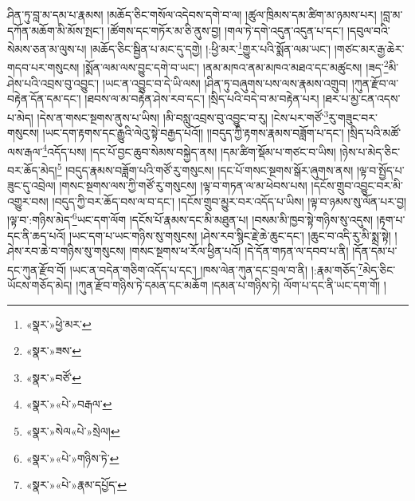 ཤིན་ཏུ་བླ་མ་དམ་པ་རྣམས། །མཆོད་ཅིང་གསོལ་འདེབས་དགེ་བ་ལ། །ཚུལ་ཁྲིམས་དམ་ཚིག་མ་ཉམས་པར། །བླ་མ་དཀོན་མཆོག་མི་མོས་སྤང་། །ཚོགས་དང་གཏོར་མ་ཅི་ནུས་བྱ། །གལ་ཏེ་དགེ་འདུན་འདུན་པ་དང་། །དབུལ་བའི་སེམས་ཅན་མ་ལུས་པ། །མཆོད་ཅིང་སྦྱིན་པ་མང་དུ་དགྱེ། །:ཕྱི་མར་\footnote{«སྣར་»ཕྱེ་མར་}གྱུར་པའི་སྨོན་ལམ་ཡང་། །གཙང་མར་རྒྱ་ཆེར་གདབ་པར་གསུངས། །སྨོན་ལམ་ལས་བྱུང་དགེ་བ་ཡང་། །ནམ་མཁའ་ནམ་མཁའ་མཐའ་དང་མཚུངས། །ཟད་\footnote{«སྣར་»ཟས་}མི་ཤེས་པའི་འབྲས་བུ་འབྱུང་། །ཡང་ན་འབྱུང་བ་དེ་ཡི་ལས། །ཤིན་ཏུ་བཞུགས་པས་ལས་རྣམས་འགྲུབ། །ཀུན་རྫོབ་ལ་བརྟེན་དོན་དམ་དང་། །ཐབས་ལ་མ་བརྟེན་ཤེས་རབ་དང་། །སྲིད་པའི་བདེ་བ་མ་བརྟེན་པར། །ཐར་པ་མྱ་ངན་འདས་པ་མེད། །དེས་ན་གསང་སྔགས་ནུས་པ་ཡིས། །མི་བསླུ་འབྲས་བུ་འབྱུང་བ་རུ། །ངེས་པར་གཙོ་\footnote{«སྣར་»བཙོ་}རུ་གཟུང་བར་གསུངས། །ཡང་དག་རྟགས་དང་རྒྱུའི་ལེའུ་སྟེ་བརྒྱད་པའོ།། །།བདུད་ཀྱི་རྟགས་རྣམས་བཟློག་པ་དང་། །སྲིད་པའི་མཚོ་ལས་རྒལ་\footnote{«སྣར་»«པེ་»བརྒལ་}འདོད་པས། །དང་པོ་བྱང་ཆུབ་སེམས་བསྐྱེད་ནས། །དམ་ཚིག་སྡོམ་པ་གཙང་བ་ཡིས། །ཉེས་པ་མེད་ཅིང་བར་ཆོད་མེད།\footnote{«སྣར་»སེལ«པེ་»སྲེལ།} །བདུད་རྣམས་བཟློག་པའི་གཙོ་རུ་གསུངས། །དང་པོ་གསང་སྔགས་སྒོར་ཞུགས་ནས། །ལྟ་བ་སྤྱོད་པ་ཟུང་དུ་འབྲེལ། །གསང་སྔགས་ལས་ཀྱི་གཙོ་རུ་གསུངས། །ལྟ་བ་གཏན་ལ་མ་ཕེབས་པས། །དངོས་གྲུབ་འབྱུང་བར་མི་འགྱུར་བས། །བདུད་ཀྱི་བར་ཆོད་བས་ལ་བ་དང་། །དངོས་གྲུབ་མྱུར་བར་འདོད་པ་ཡིས། །ལྟ་བ་ཉམས་སུ་ལོན་པར་བྱ། །ལྟ་བ་:གཉིས་མེད་\footnote{«སྣར་»«པེ་»གཉིས་ཏེ་}ཡང་དག་ལོག །དངོས་པོ་རྣམས་དང་མི་མཐུན་པ། །བསམ་མི་ཁྱབ་སྟེ་གཉིས་སུ་འདུས། །རྟག་པ་དང་ནི་ཆད་པའོ། །ཡང་དག་པ་ཡང་གཉིས་སུ་གསུངས། །ཤེས་རབ་སྙིང་རྗེ་ཆེ་ཆུང་དང་། །ཆུང་བ་འདི་རུ་མི་སྨྲ་སྟེ། །ཤེས་རབ་ཆེ་བ་གཉིས་སུ་གསུངས། །གསང་སྔགས་ཕ་རོལ་ཕྱིན་པའོ། །དེ་དོན་གཏན་ལ་དབབ་པ་ནི། །དོན་དམ་པ་དང་ཀུན་རྫོབ་བོ། །ཡང་ན་བདེན་གཅིག་འདོད་པ་དང་། །ཁས་ལེན་ཀུན་དང་བྲལ་བ་ནི། །:རྣམ་གཅོད་\footnote{«སྣར་»«པེ་»རྣམ་དཔྱོད་}མེད་ཅིང་ཡོངས་གཅོད་མེད། །ཀུན་རྫོབ་གཉིས་ཏེ་དམན་དང་མཆོག །དམན་པ་གཉིས་ཏེ། ལོག་པ་དང་ནི་ཡང་དག་གོ། །

